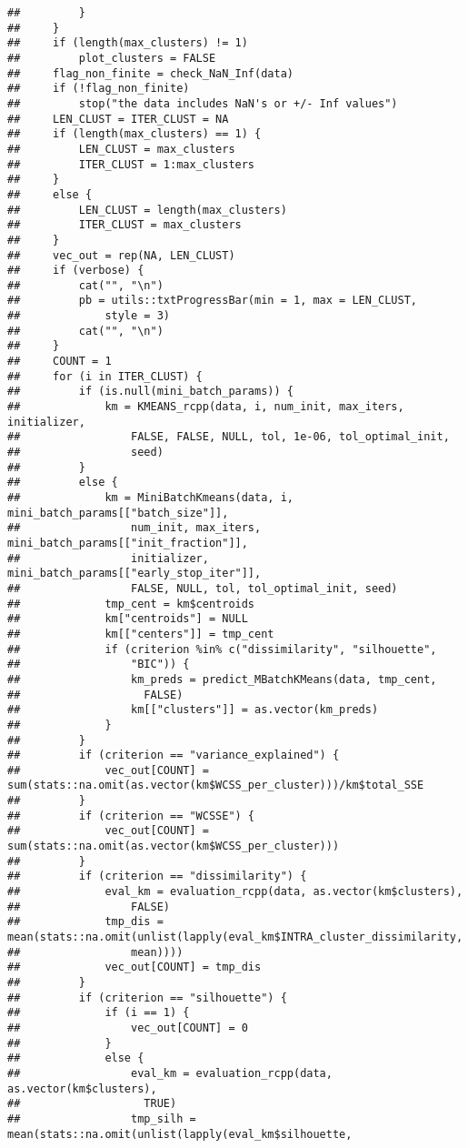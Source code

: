 \documentclass[
]{article}
\begin{document}
\begin{verbatim}
##         }
##     }
##     if (length(max_clusters) != 1) 
##         plot_clusters = FALSE
##     flag_non_finite = check_NaN_Inf(data)
##     if (!flag_non_finite) 
##         stop("the data includes NaN's or +/- Inf values")
##     LEN_CLUST = ITER_CLUST = NA
##     if (length(max_clusters) == 1) {
##         LEN_CLUST = max_clusters
##         ITER_CLUST = 1:max_clusters
##     }
##     else {
##         LEN_CLUST = length(max_clusters)
##         ITER_CLUST = max_clusters
##     }
##     vec_out = rep(NA, LEN_CLUST)
##     if (verbose) {
##         cat("", "\n")
##         pb = utils::txtProgressBar(min = 1, max = LEN_CLUST, 
##             style = 3)
##         cat("", "\n")
##     }
##     COUNT = 1
##     for (i in ITER_CLUST) {
##         if (is.null(mini_batch_params)) {
##             km = KMEANS_rcpp(data, i, num_init, max_iters, initializer, 
##                 FALSE, FALSE, NULL, tol, 1e-06, tol_optimal_init, 
##                 seed)
##         }
##         else {
##             km = MiniBatchKmeans(data, i, mini_batch_params[["batch_size"]], 
##                 num_init, max_iters, mini_batch_params[["init_fraction"]], 
##                 initializer, mini_batch_params[["early_stop_iter"]], 
##                 FALSE, NULL, tol, tol_optimal_init, seed)
##             tmp_cent = km$centroids
##             km["centroids"] = NULL
##             km[["centers"]] = tmp_cent
##             if (criterion %in% c("dissimilarity", "silhouette", 
##                 "BIC")) {
##                 km_preds = predict_MBatchKMeans(data, tmp_cent, 
##                   FALSE)
##                 km[["clusters"]] = as.vector(km_preds)
##             }
##         }
##         if (criterion == "variance_explained") {
##             vec_out[COUNT] = sum(stats::na.omit(as.vector(km$WCSS_per_cluster)))/km$total_SSE
##         }
##         if (criterion == "WCSSE") {
##             vec_out[COUNT] = sum(stats::na.omit(as.vector(km$WCSS_per_cluster)))
##         }
##         if (criterion == "dissimilarity") {
##             eval_km = evaluation_rcpp(data, as.vector(km$clusters), 
##                 FALSE)
##             tmp_dis = mean(stats::na.omit(unlist(lapply(eval_km$INTRA_cluster_dissimilarity, 
##                 mean))))
##             vec_out[COUNT] = tmp_dis
##         }
##         if (criterion == "silhouette") {
##             if (i == 1) {
##                 vec_out[COUNT] = 0
##             }
##             else {
##                 eval_km = evaluation_rcpp(data, as.vector(km$clusters), 
##                   TRUE)
##                 tmp_silh = mean(stats::na.omit(unlist(lapply(eval_km$silhouette, 

\end{verbatim}
\end{document}
